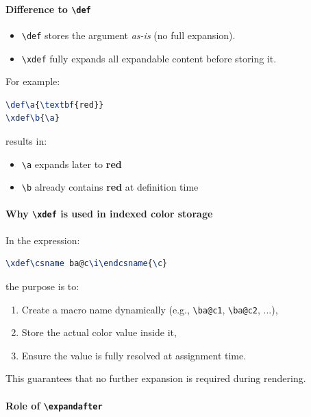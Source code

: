 \paragraph{Difference to \texttt{\textbackslash def}}

\begin{itemize}
\item \verb|\def| stores the argument \emph{as-is} (no full expansion).
\item \verb|\xdef| fully expands all expandable content before storing it.
\end{itemize}

For example:

\begin{lstlisting}[language=LaTeX]
\def\a{\textbf{red}}
\xdef\b{\a}
\end{lstlisting}

results in:

\begin{itemize}
\item \verb|\a| expands later to \textbf{red}
\item \verb|\b| already contains \textbf{red} at definition time
\end{itemize}



\paragraph{Why \texttt{\textbackslash xdef} is used in indexed color storage}

In the expression:

\begin{lstlisting}[language=LaTeX]
\xdef\csname ba@c\i\endcsname{\c}
\end{lstlisting}

the purpose is to:

\begin{enumerate}
\item Create a macro name dynamically (e.g., \verb|\ba@c1|, \verb|\ba@c2|, ...),
\item Store the actual color value inside it,
\item Ensure the value is fully resolved at assignment time.
\end{enumerate}

This guarantees that no further expansion is required during rendering.



\paragraph{Role of \texttt{\textbackslash expandafter}}

